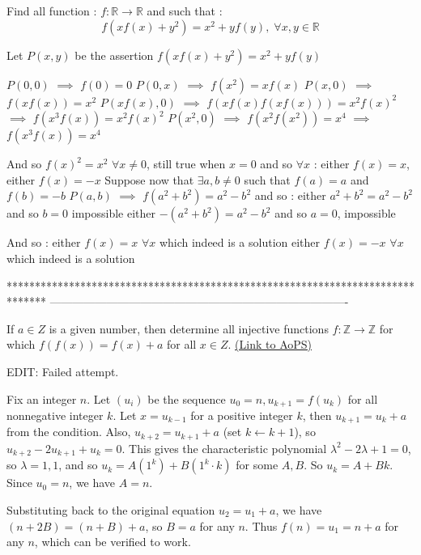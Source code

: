 \begin{solution}
	\begin{tcolorbox}Find all function : $f:\mathbb{R}\rightarrow \mathbb{R}$ and such that :
\[f(xf(x)+y^2)=x^2+yf(y),\;\forall x,y\in \mathbb{R}\]\end{tcolorbox}
Let $P(x,y)$ be the assertion $f(xf(x)+y^2)=x^2+yf(y)$

$P(0,0)$ $\implies$ $f(0)=0$
$P(0,x)$ $\implies$ $f(x^2)=xf(x)$
$P(x,0)$ $\implies$ $f(xf(x))=x^2$
$P(xf(x),0)$ $\implies$ $f(xf(x)f(xf(x)))=x^2f(x)^2$ $\implies$ $f(x^3f(x))=x^2f(x)^2$
$P(x^2,0)$ $\implies$  $f(x^2f(x^2))=x^4$ $\implies$ $f(x^3f(x))=x^4$

And so $f(x)^2=x^2$ $\forall x\ne 0$, still true when $x=0$ and so $\forall x$ : either $f(x)=x$, either $f(x)=-x$
Suppose now that $\exists a,b\ne 0$ such that $f(a)=a$ and $f(b)=-b$
$P(a,b)$ $\implies$ $f(a^2+b^2)=a^2-b^2$ and so :
either $a^2+b^2=a^2-b^2$ and so $b=0$ impossible
either $-(a^2+b^2)=a^2-b^2$ and so $a=0$, impossible

And so :
either $\boxed{f(x)=x}$ $\forall x$ which indeed is a solution
either $\boxed{f(x)=-x}$ $\forall x$ which indeed is a solution
\end{solution}
*******************************************************************************
-------------------------------------------------------------------------------

\begin{problem}
	If $a{\in}Z$ is a given number, then determine all injective functions $f:  \mathbb{Z}\to\mathbb{Z}$ for which $f(f(x))=f(x)+a$ for all $x{\in}Z$.
	\flushright \href{https://artofproblemsolving.com/community/c6h618911}{(Link to AoPS)}
\end{problem}



\begin{solution}
	EDIT: Failed attempt.

Fix an integer $n$. Let $(u_i)$ be the sequence $u_0 = n, u_{k+1} = f(u_k)$ for all nonnegative integer $k$. Let $x = u_{k-1}$ for a positive integer $k$, then $u_{k+1} = u_k + a$ from the condition. Also, $u_{k+2} = u_{k+1} + a$ (set $k \leftarrow k+1$), so $u_{k+2} - 2u_{k+1} + u_k = 0$. This gives the characteristic polynomial $\lambda^2 - 2\lambda + 1 = 0$, so $\lambda = 1, 1$, and so $u_k = A(1^k) + B(1^k \cdot k)$ for some $A,B$. So $u_k = A + Bk$. Since $u_0 = n$, we have $A = n$.

Substituting back to the original equation $u_2 = u_1 + a$, we have $(n+2B) = (n+B) + a$, so $B = a$ for any $n$. Thus $f(n) = u_1 = n+a$ for any $n$, which can be verified to work.
\end{solution}



